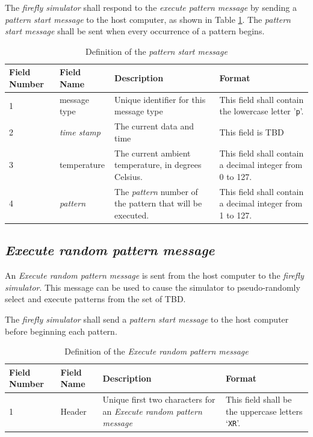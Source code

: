 \documentclass[letterpaper,11pt]{article}
\begin{document}
The \textit{firefly simulator} shall respond to the \textit{execute pattern
message} by sending a \textit{pattern start message} to the host computer,
as shown in Table \ref{tab:PatternStart}. The \textit{pattern start message}
shall be sent when every occurrence of a pattern begins.

\begin{table}[H]
  \caption{Definition of the \textit{pattern start message}}
  \centering
  \setlength\extrarowheight{2pt}
  \begin{tabular}[h]{|p{0.5in}|p{1.00in}|p{2.25in}|p{2.25in}|} \hline
    Field Number & Field Name & Description & Format \\ \hline
    1            & message type

    & Unique identifier for this message type
    & This field shall contain the lowercase letter '\texttt{p}'.
    \\ \hline
    2            & \textit{time stamp}
    & The current data and time
    & This field is TBD
    \\ \hline
    3            & temperature
    & The current ambient temperature, in degrees Celsius.
    & This field shall contain a decimal integer from 0 to 127.
    \\ \hline
    4            & \textit{pattern}

    & The \textit{pattern} number of the pattern that will be executed.
    & This field shall contain a decimal integer from 1 to 127.
    \\ \hline
  \end{tabular}
  \label{tab:PatternStart}
\end{table}

\subsection{\textit{Execute random pattern message}}

An \textit{Execute random pattern message} is sent from the host computer to the
\textit{firefly simulator}. This message can be used to cause the simulator to
pseudo-randomly select and execute patterns from the set of TBD.

The \textit{firefly simulator} shall send a \textit{pattern start message}
to the host computer before beginning each pattern.

\begin{table}[H]
  \caption{Definition of the \textit{Execute random pattern message}}
  \centering
  \setlength\extrarowheight{2pt}
  \begin{tabular}[h]{|p{0.5in}|p{1.00in}|p{2.25in}|p{2.25in}|} \hline
    Field Number & Field Name & Description & Format \\ \hline
    1            & Header
                 & Unique first two characters for an \textit{Execute random
                 pattern message}
                 & This field shall be the uppercase letters `\texttt{XR}'.
                 \\ \hline
  \end{tabular}
  \label{tab:ExecuteRandom}
\end{table}
\end{document}
